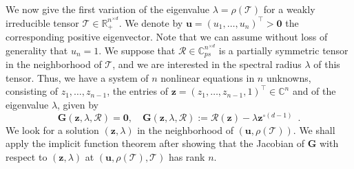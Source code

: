 \documentclass{amsart}
\newcommand{\C}{\mathbb{C}}
\newcommand{\R}{\mathbb{R}}
\newcommand{\bG}{\mathbf{G}}
\newcommand{\uu}{\mathbf{u}}
\newcommand{\z}{\mathbf{z}}
\newcommand{\0}{\mathbf{0}}
\newcommand{\1}{\mathbf{1}}
\newcommand{\cR}{\mathcal{R}}
\newcommand{\cT}{\mathcal{T}}
\newcommand{\trans}{^\top}
\theoremstyle{remark}
\numberwithin{equation}{section} %
\begin{document}
 We now give the first variation of the eigenvalue $\lambda=\rho(\cT)$ for a weakly irreducible tensor $\cT\in\R_+^{n^{\times d}}$.
We denote by $\uu=(u_1,\ldots,u_n)\trans>\0$
the corresponding positive eigenvector.
Note that we can assume without loss of generality
 that $u_n=1$.  
We suppose that $\cR\in \C^{n^{\times d}}_{ps} $ is a partially symmetric tensor in the neighborhood of $\cT$, and we
are interested in the spectral radius $\lambda$ of this tensor.
%
Thus, we have a system of $n$ nonlinear equations in $n$ unknowns, consisting of $z_1,\ldots,z_{n-1}$, the entries of $\z=(z_1,\ldots,z_{n-1},1)\trans\in\C^n$  and of the eigenvalue $\lambda$,
given by  \begin{equation}\label{eigeq}
 \bG(\z,\lambda,\cR)=\0, \quad \bG(\z,\lambda,\cR):=\cR(\z)-\lambda\z^{\circ(d-1)}
%
\enspace .
 \end{equation}
 We look for a solution
%
%
%
%
$(\z,\lambda)$ in the neighborhood of $(\uu,\rho(\cT))$.
We shall apply the implicit function theorem 
after showing that the Jacobian of $\bG$ with respect to $(\z,\lambda)$ at $(\uu,\rho(\cT),\cT)$
 has rank $n$.
\end{document}
